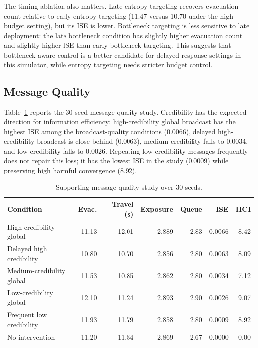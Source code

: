 The timing ablation also matters. Late entropy targeting recovers evacuation
count relative to early entropy targeting (11.47 versus 10.70 under the
high-budget setting), but its ISE is lower. Bottleneck targeting is less
sensitive to late deployment: the late bottleneck condition has slightly higher
evacuation count and slightly higher ISE than early bottleneck targeting. This
suggests that bottleneck-aware control is a better candidate for delayed
response settings in this simulator, while entropy targeting needs stricter
budget control.

\subsection{Message Quality}
\label{subsec:message-quality-results}

Table~\ref{tab:message-quality} reports the 30-seed message-quality study.
Credibility has the expected direction for information efficiency:
high-credibility global broadcast has the highest ISE among the
broadcast-quality conditions (0.0066), delayed high-credibility broadcast is
close behind (0.0063), medium credibility falls to 0.0034, and low credibility
falls to 0.0026. Repeating low-credibility messages frequently does not repair
this loss; it has the lowest ISE in the study (0.0009) while preserving high
harmful convergence (8.92).

\begin{table}[!t]
\centering
\caption{Supporting message-quality study over 30 seeds.}
\label{tab:message-quality}
\begin{tabular}{lrrrrrr}
\toprule
Condition & Evac. & Travel (s) & Exposure & Queue & ISE & HCI \\
\midrule
High-credibility global & 11.13 & 12.01 & 2.889 & 2.83 & 0.0066 & 8.42 \\
Delayed high credibility & 10.80 & 10.70 & 2.856 & 2.80 & 0.0063 & 8.09 \\
Medium-credibility global & 11.53 & 10.85 & 2.862 & 2.80 & 0.0034 & 7.12 \\
Low-credibility global & 12.10 & 11.24 & 2.893 & 2.90 & 0.0026 & 9.07 \\
Frequent low credibility & 11.93 & 11.79 & 2.858 & 2.80 & 0.0009 & 8.92 \\
No intervention & 11.20 & 11.84 & 2.869 & 2.67 & 0.0000 & 0.00 \\
\bottomrule
\end{tabular}
\end{table}

